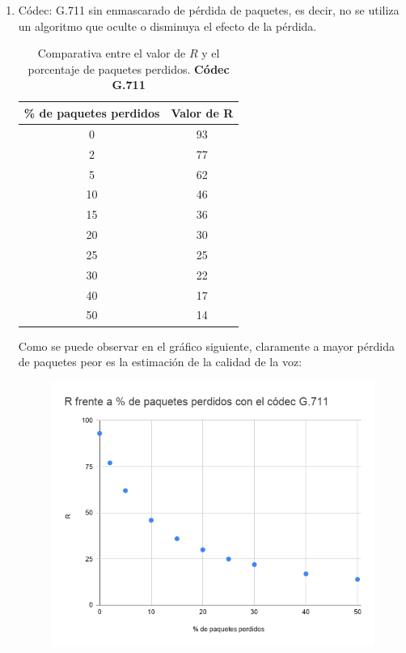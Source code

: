 \documentclass[11pt,a4paper]{article}
\begin{document}
\begin{enumerate}
	\item Códec: G.711 sin enmascarado de pérdida de paquetes, es decir, no se utiliza un algoritmo que oculte o disminuya el efecto de la pérdida.
	
	\begin{table}[H]
	\centering
		\begin{tabular}{|c|c|}
		\hline
		\textbf{\% de paquetes perdidos} & \textbf{Valor de R} \\ \hline
			0                                & 93                  \\ \hline
			2                                & 77                  \\ \hline
			5                                & 62                  \\ \hline
			10                               & 46                  \\ \hline
			15                               & 36                  \\ \hline
			20                               & 30                  \\ \hline
			25                               & 25                  \\ \hline
			30                               & 22                  \\ \hline
			40                               & 17                  \\ \hline
			50                               & 14                  \\ \hline
		\end{tabular}
	\caption{Comparativa entre el valor de $R$ y el porcentaje de paquetes perdidos. \textbf{Códec G.711}}
	\end{table}

Como se puede observar en el gráfico siguiente, claramente a mayor pérdida de paquetes peor es la estimación de la calidad de la voz:

	\begin{figure}[H]
	\centering
		\includegraphics[scale=0.5]{img/grafico.png}
	\end{figure}
	

\end{enumerate}
\end{document}
